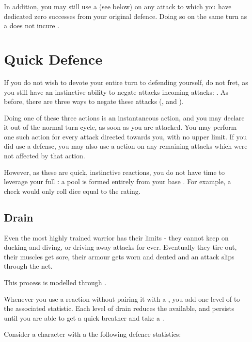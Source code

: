 In addition, you may still use a  (see below) on any attack to which you have dedicated zero successes from your original defence. Doing so on the same turn as a  does not incure . 

\section{Quick Defence}

If you do not wish to devote your entire turn to defending yourself, do not fret, as you still have an instinctive ability to negate attacks incoming attacks: . As before, there are three ways to negate these attacks (,  and ).

Doing one of these three actions is an instantaneous action, and you may declare it out of the normal turn cycle, as soon as you are attacked. You may perform one such action for every attack directed towards you, with no upper limit. If you did use a  defense, you may also use a  action on any remaining attacks which were not affected by that action.

However, as these are quick, instinctive reactions, you do not have time to leverage your full : a  pool is formed entirely from your base . For example, a  check would only roll dice equal to the  rating. 

\subsection{Drain}

Even the most highly trained warrior has their limits - they cannot keep on ducking and diving, or driving away attacks for ever. Eventually they tire out, their muscles get sore, their armour gets worn and dented and an attack slips through the net. 

This process is modelled through . 

Whenever you use a  reaction without pairing it with a , you add one level of  to the associated statistic. Each level of drain reduces the  available, and persists until you are able to get a quick breather and take a .

Consider a character with a the following defence statistics:


